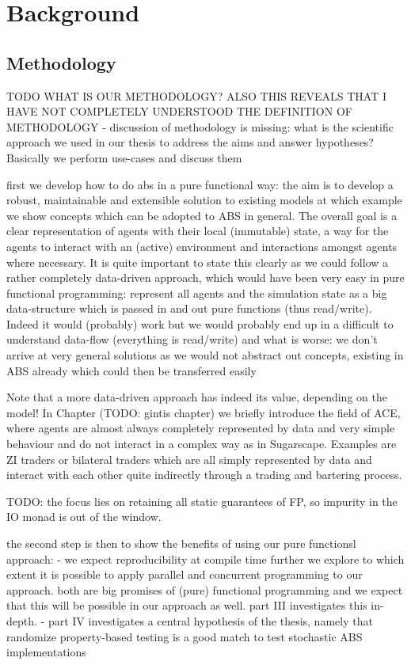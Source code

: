 \chapter{Background}
\label{ch:methodology}





\section{Methodology}
TODO WHAT IS OUR METHODOLOGY? ALSO THIS REVEALS THAT I HAVE NOT COMPLETELY UNDERSTOOD THE DEFINITION OF METHODOLOGY
- discussion of methodology is missing: what is the scientific approach we used in our thesis to address the aims and answer hypotheses? Basically we perform use-cases and discuss them

first we develop how to do abs in a pure functional way: the aim is to develop a robust, maintainable and extensible solution to existing models at which example we show concepts which can be adopted to ABS in general. The overall goal is a clear representation of agents with their local (immutable) state, a way for the agents to interact with an (active) environment and interactions amongst agents where necessary. It is quite important to state this clearly as we could follow a rather completely data-driven approach, which would have been very easy in pure functional programming: represent all agents and the simulation state as a big data-structure which is passed in and out pure functions (thus read/write). Indeed it would (probably) work but we would probably end up in a difficult to understand data-flow (everything is read/write) and what is worse: we don't arrive at very general solutions as we would not abstract out concepts, existing in ABS already which could then be transferred easily

Note that a more data-driven approach has indeed its value, depending on the model! In Chapter (TODO: gintis chapter) we briefly introduce the field of ACE, where agents are almost always completely represented by data and very simple behaviour and do not interact in a complex way as in Sugarscape. Examples are ZI traders or bilateral traders which are all simply represented by data and interact with each other quite indirectly through a trading and bartering process.

TODO: the focus lies on retaining all static guarantees of FP, so impurity in the IO monad is out of the window. 

the second step is then to show the benefits of using our pure functionsl approach:
- we expect reproducibility at compile time
further we explore to which extent it is possible to apply parallel and concurrent programming to our approach. both are big promises of (pure) functional programming and we expect that this will be possible in our approach as well. part III investigates this in-depth.
- part IV investigates a central hypothesis of the thesis, namely that randomize property-based testing is a good match to test stochastic ABS implementations 